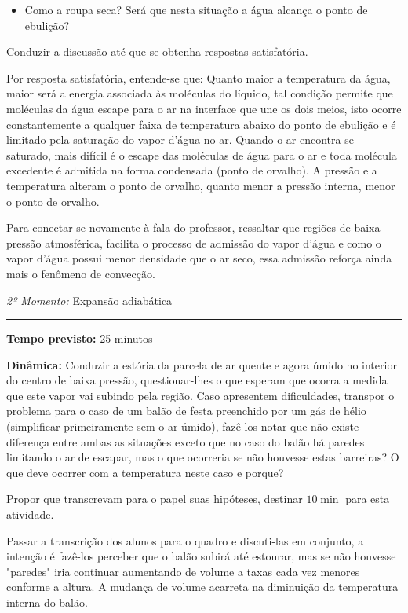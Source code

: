 \begin{itemize}
		\item Como a roupa seca? Será que nesta situação a água alcança o ponto de ebulição?
\end{itemize}

Conduzir a discussão até que se obtenha respostas satisfatória.

Por resposta satisfatória, entende-se que: Quanto maior a temperatura da água, maior será a energia associada às moléculas do líquido, tal condição permite que moléculas da água escape para o ar na interface que une os dois meios, isto ocorre constantemente a qualquer faixa de temperatura abaixo do ponto de ebulição e é limitado pela saturação do vapor d'água no ar. Quando o ar encontra-se saturado, mais difícil é o escape das moléculas de água para o ar e toda molécula excedente é admitida na forma condensada (ponto de orvalho). A pressão e a temperatura alteram o ponto de orvalho, quanto menor a pressão interna, menor o ponto de orvalho.

Para conectar-se novamente à fala do professor, ressaltar que regiões de baixa pressão atmosférica, facilita o processo de admissão do vapor d'água e como o vapor d'água possui menor densidade que o ar seco, essa admissão reforça ainda mais o fenômeno de convecção.

\vspace{50pt}
\noindent\emph{2º Momento:} Expansão adiabática
\par\noindent\rule{.3\textwidth}{.5pt}    
\par\noindent\textbf{Tempo previsto:} 25 minutos


\noindent\textbf{Dinâmica:} Conduzir a estória da parcela de ar quente e agora úmido no interior do centro de baixa pressão, questionar-lhes o que esperam que ocorra a medida que este vapor vai subindo pela região. Caso apresentem dificuldades, transpor o problema para o caso de um balão de festa preenchido por um gás de hélio (simplificar primeiramente sem o ar úmido), fazê-los notar que não existe diferença entre ambas as situações exceto que no caso do balão há paredes limitando o ar de escapar, mas o que ocorreria se não houvesse estas barreiras? O que deve ocorrer com a temperatura neste caso e porque?

Propor que transcrevam para o papel suas hipóteses, destinar $10\min$ para esta atividade.

Passar a transcrição dos alunos para o quadro e discuti-las em conjunto, a intenção é fazê-los perceber que o balão subirá até estourar, mas se não houvesse "paredes" iria continuar aumentando de volume a taxas cada vez menores conforme a altura. A mudança de volume acarreta na diminuição da temperatura interna do balão. 

